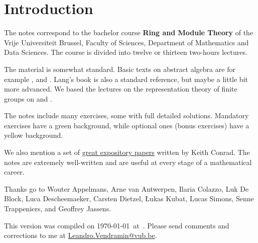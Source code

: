 \thispagestyle{plain}

\section*{Introduction}

The notes correspond to the bachelor 
course \textbf{Ring and Module Theory} of the 
Vrije Universiteit Brussel, 
Faculty of Sciences, 
Department of Mathematics and Data Sciences. The course
is divided into twelve or thirteen two-hours lectures. 

The material is somewhat standard. Basic texts on abstract algebra
are for example \cite{MR1129886}, \cite{MR2286236} and \cite{MR600654}. 
Lang's book \cite{MR783636} is also a standard reference, but 
maybe a little bit more advanced. 
We based the lectures on the representation theory of finite
groups on \cite{MR0450380} and 
\cite{MR2867444}. 

The notes include many exercises, some with full detailed solutions. Mandatory exercises have a \colorbox{green!5!white}{green background}, while optional ones (bonus exercises) have a \colorbox{yellow!15!white}{yellow background}.


We also mention a set of \href{https://kconrad.math.uconn.edu/blurbs/}{great expository papers} written 
by Keith Conrad. 
The notes are extremely well-written and are useful at  
every stage of a mathematical career. 


Thanks go to Wouter Appelmans, Arne van Antwerpen, Ilaria Colazzo, Luk De Block, 
Luca Descheemaeker, Carsten Dietzel, {\L}ukas Kubat, Lucas Simons, Senne Trappeniers, 
and Geoffrey Jassens. 

This version 
was compiled on \today~at~\currenttime. 
Please send comments and corrections to me at \url{Leandro.Vendramin@vub.be}. 


